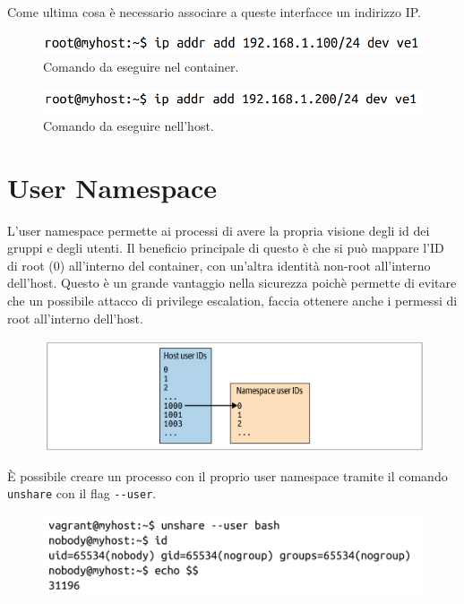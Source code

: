 Come ultima cosa è necessario associare a queste interfacce un indirizzo IP.

\begin{figure}[H]
    \centering
    \includegraphics[width=12cm, keepaspectratio]{capitoli/os_security/imgs/net7.png}
    \caption{Comando da eseguire nel container.}
\end{figure}

\begin{figure}[H]
    \centering
    \includegraphics[width=12cm, keepaspectratio]{capitoli/os_security/imgs/net8.png}
    \caption{Comando da eseguire nell'host.}
\end{figure}

\section{User Namespace}

L'user namespace permette ai processi di avere la propria visione degli id dei
gruppi e degli utenti. Il beneficio principale di questo è che si può mappare
l'ID di root (0) all'interno del container, con un'altra identità non-root
all'interno dell'host. Questo è un grande vantaggio nella sicurezza poichè
permette di evitare che un possibile attacco di privilege escalation, faccia ottenere
anche i permessi di root all'interno dell'host.

\begin{figure}[H]
    \centering
    \includegraphics[width=\textwidth, keepaspectratio]{capitoli/os_security/imgs/user1.png}
\end{figure}

È possibile creare un processo con il proprio user namespace tramite il comando
\verb|unshare| con il flag \verb|--user|.

\begin{figure}[H]
    \centering
    \includegraphics[width=\textwidth, keepaspectratio]{capitoli/os_security/imgs/user2.png}
\end{figure}

